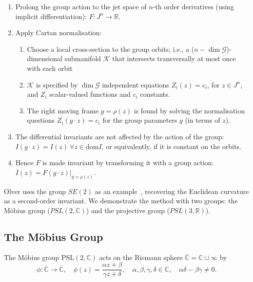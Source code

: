 \documentclass[review,onefignum,onetabnum]{siamonline190516}
\begin{document}
\begin{enumerate}
\item Prolong the group action to the jet space of $n$-th order derivatives (using implicit differentiation): $F: J^n \to \mathbb{R}$. 
\item Apply Cartan normalisation:
    \begin{enumerate}
    \item Choose a local cross-section to the group orbits, i.e., a ($n - \dim \mathcal{G}$)-dimensional submanifold $\mathcal{K}$ that intersects transversally at most once with each orbit
    \item $\mathcal{K}$ is specified by $\dim \mathcal{G}$ independent equations $Z_i (z) = c_i$, for $z \in J^n$,  and $Z_i$ scalar-valued functions and $c_i$ constants.
    \item The right moving frame $g = \rho(z)$ is found by solving the normalisation questions $Z_i (g \cdot z) = c_i$ for the group parameters $g$ (in terms of $z$).
    \end{enumerate}
\item The differential invariants are not affected by the action of the group: $I(g \cdot z) = I(z) \: \forall z \in \mathrm{dom} I$, or equivalently, if it is constant on the orbits. 
\item Hence $F$ is made invariant by transforming it with a group action: $I(z) = F(g \cdot z) |_{g=\rho(z)}$.  
\end{enumerate}

Olver uses the group $SE(2)$ as an example~\cite{Olver}, recovering the Euclidean curvature as a second-order invariant. We demonstrate the method with two groups: the M\"obius group ($PSL(2,\mathbb{C})$) and the projective group ($PSL(3,\mathbb{R})$). 

\subsection{The M\"{o}bius Group}

The M\"obius group $\mathrm{PSL}(2,\mathbb{C})$ acts on the Riemann sphere
$\overline{\mathbb{C}} = \mathbb{C}\cup\infty$ by 
$$ \phi\colon \overline{\mathbb{C}} \to \overline{\mathbb{C}},\quad \phi(z) = \frac{\alpha z + \beta}{\gamma z + \delta},\quad \alpha,\beta,\gamma,\delta\in\mathbb{C}, \quad
\alpha\delta-\beta\gamma\ne 0.$$
\end{document}
